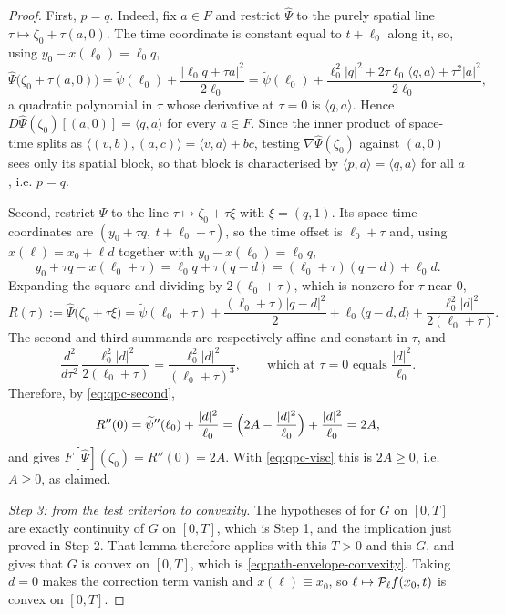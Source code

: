 \begin{proof}
First, $p=q$. Indeed, fix $a\in F$ and restrict $\widehat\Psi$ to the purely spatial
line $\tau\mapsto\zeta_0+\tau(a,0)$. The time coordinate is constant equal to
$t+\ell_0$ along it, so, using $y_0-x(\ell_0)=\ell_0q$,
\[
  \widehat\Psi\bigl(\zeta_0+\tau(a,0)\bigr)
   =\widetilde\psi(\ell_0)+\frac{|\ell_0q+\tau a|^2}{2\ell_0}
   =\widetilde\psi(\ell_0)
     +\frac{\ell_0^2|q|^2+2\tau\ell_0\langle q,a\rangle+\tau^2|a|^2}{2\ell_0},
\]
a quadratic polynomial in $\tau$ whose derivative at $\tau=0$ is $\langle q,a\rangle$.
Hence $D\widehat\Psi(\zeta_0)[(a,0)]=\langle q,a\rangle$ for every $a\in F$. Since the
inner product of space-time splits as
$\langle(v,b),(a,c)\rangle=\langle v,a\rangle+bc$, testing
$\nabla\widehat\Psi(\zeta_0)$ against $(a,0)$ sees only its spatial block, so that
block is characterised by $\langle p,a\rangle=\langle q,a\rangle$ for all $a$, i.e.
$p=q$.

Second, restrict $\widehat\Psi$ to the line $\tau\mapsto\zeta_0+\tau\xi$ with
$\xi=(q,1)$. Its space-time coordinates are $(y_0+\tau q,\ t+\ell_0+\tau)$, so the
time offset is $\ell_0+\tau$ and, using $x(\ell)=x_0+\ell d$ together with
$y_0-x(\ell_0)=\ell_0q$,
\[
  y_0+\tau q-x(\ell_0+\tau)=\ell_0q+\tau(q-d)=(\ell_0+\tau)(q-d)+\ell_0d .
\]
Expanding the square and dividing by $2(\ell_0+\tau)$, which is nonzero for $\tau$
near $0$,
\[
  R(\tau):=\widehat\Psi\bigl(\zeta_0+\tau\xi\bigr)
   =\widetilde\psi(\ell_0+\tau)+\frac{(\ell_0+\tau)|q-d|^2}{2}
     +\ell_0\langle q-d,d\rangle+\frac{\ell_0^2|d|^2}{2(\ell_0+\tau)} .
\]
The second and third summands are respectively affine and constant in $\tau$, and
\[
  \frac{d^2}{d\tau^2}\,\frac{\ell_0^2|d|^2}{2(\ell_0+\tau)}
   =\frac{\ell_0^2|d|^2}{(\ell_0+\tau)^3},
  \qquad\text{which at }\tau=0\text{ equals }\frac{|d|^2}{\ell_0}.
\]
Therefore, by \eqref{eq:qpc-second},
\[
  R''(0)=\widetilde\psi''(\ell_0)+\frac{|d|^2}{\ell_0}
   =\Bigl(2A-\frac{|d|^2}{\ell_0}\Bigr)+\frac{|d|^2}{\ell_0}=2A,
\]
and  gives
$F[\widehat\Psi](\zeta_0)=R''(0)=2A$. With \eqref{eq:qpc-visc} this is $2A\ge0$,
i.e. $A\ge0$, as claimed.

\emph{Step 3: from the test criterion to convexity.}
The hypotheses of  for $G$ on $[0,T]$ are exactly
continuity of $G$ on $[0,T]$, which is Step 1, and the implication just proved in
Step 2. That lemma therefore applies with this $T>0$ and this $G$, and gives that
$G$ is convex on $[0,T]$, which is \eqref{eq:path-envelope-convexity}. Taking $d=0$
makes the correction term vanish and $x(\ell)\equiv x_0$, so
$\ell\mapsto\mathcal{P}_\ell f(x_0,t)$ is convex on $[0,T]$.



\end{proof}
